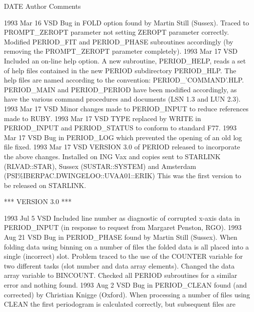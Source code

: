 \documentclass[twoside,11pt,noabs,nolof]{starlink}
\begin{document}
\newpage

\begin{small}
\begin{terminalv}
   DATE       Author            Comments

1993 Mar 16    VSD       Bug in FOLD option found by Martin Still (Sussex).
                         Traced to PROMPT_ZEROPT parameter not setting
                         ZEROPT parameter correctly. Modified PERIOD_FIT and
                         PERIOD_PHASE subroutines accordingly (by removing
                         the PROMPT_ZEROPT parameter completely).
1993 Mar 17    VSD       Included an on-line help option. A new subroutine,
                         PERIOD_HELP, reads a set of help files contained
                         in the new PERIOD subdirectory PERIOD_HLP. The help
                         files are named according to the convention:
                         PERIOD_'COMMAND'.HLP. PERIOD_MAIN and
                         PERIOD_PERIOD have been modified accordingly,
                         as have the various command procedures and
                         documents (LSN 1.3 and LUN 2.3).
1993 Mar 17    VSD       Minor changes made to PERIOD_INPUT to reduce
                         references made to RUBY.
1993 Mar 17    VSD       TYPE replaced by WRITE in PERIOD_INPUT and
                         PERIOD_STATUS to conform to standard F77.
1993 Mar 17    VSD       Bug in PERIOD_LOG which prevented the opening
                         of an old log file fixed.
1993 Mar 17    VSD       VERSION 3.0 of PERIOD released to incorporate
                         the above changes. Installed on ING Vax and
                         copies sent to STARLINK (RLVAD::STAR), Sussex
                         (SUSTAR::SYSTEM) and Amsterdam
                         (PSI\%IBERPAC.DWINGELOO::UVAA01::ERIK)
                         This was the first version to be released on STARLINK.

                         *** VERSION 3.0 ***

1993 Jul 5    VSD        Included line number as diagnostic of corrupted
                         x-axis data in PERIOD_INPUT (in response to request
                         from Margaret Penston, RGO).
1993 Aug 21   VSD        Bug in PERIOD_PHASE found by Martin Still (Sussex).
                         When folding data using binning on a number of files
                         the folded data is all placed into a single
                         (incorrect) slot. Problem traced to the use of
                         the COUNTER variable for two different tasks
                         (slot number and data array elements). Changed
                         the data array variable to BINCOUNT. Checked all
                         PERIOD subroutines for a similar error and nothing
                         found.
1993 Aug 2    VSD        Bug in PERIOD_CLEAN found (and corrected) by
                         Christian Knigge (Oxford). When processing a number
                         of files using CLEAN the first periodogram is
                         calculated correctly, but subsequent files are
\end{terminalv}
\end{small}
\end{document}
